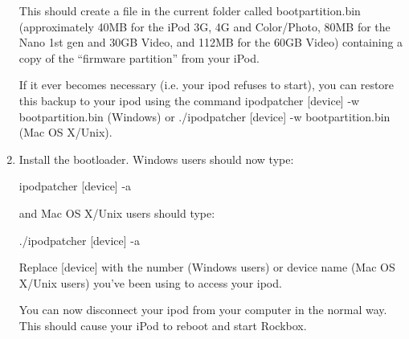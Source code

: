 \begin{enumerate}
    This should create a file in the current folder called bootpartition.bin 
    (approximately 40MB for the iPod 3G, 4G and Color/Photo, 80MB for the Nano 
    1st gen and 30GB Video, and 112MB for the 60GB Video) containing a copy of 
    the ``firmware partition'' from your iPod.

    If it ever becomes necessary (i.e. your ipod refuses to start), you can 
    restore this backup to your ipod using the command ipodpatcher [device] -w 
    bootpartition.bin (Windows) or ./ipodpatcher [device] -w bootpartition.bin 
    (Mac OS X/Unix).   

 
  \item Install the bootloader.
    Windows users should now type:
    \begin{code}
    ipodpatcher [device] -a \bootloaderfile
    \end{code}

    and Mac OS X/Unix users should type:

    \begin{code}
    ./ipodpatcher [device] -a \bootloaderfile
    \end{code}

  Replace [device] with the number (Windows users) or device name (Mac OS X/Unix 
  users) you've been using to access your ipod.  
  
  You can now disconnect your ipod from your computer in the normal way. This 
  should cause your iPod to reboot and start Rockbox.
  
\end{enumerate} 
